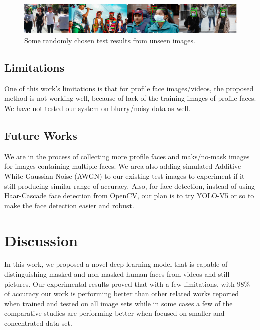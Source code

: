 \documentclass{svproc}
\begin{document}
\begin{figure}[!ht]
\includegraphics[width=1\textwidth]{test_image.PNG}
\centering
\caption{Some randomly chosen test results from unseen images.}
\label{testresult}
\end{figure}

\subsection{Limitations}

One of this work's limitations is that for profile face images/videos, the proposed method is not working well, because of lack of the training images of profile faces. We have not tested our system on blurry/noisy data as well.

\subsection{Future Works}

We are in the process of collecting more profile faces and maks/no-mask images for images containing multiple faces. We area also adding simulated Additive White Gaussian Noise (AWGN) to our existing test images to experiment if it still producing similar range of accuracy. Also, for face  detection, instead of using Haar-Cascade face detection from OpenCV, our plan is to try YOLO-V5 or so to make the face detection easier and robust.

\section{Discussion}

In this work, we proposed a novel deep learning model that is capable of distinguishing masked and non-masked human faces from videos and still pictures. Our experimental results proved that with a few limitations, with $98\%$ of accuracy our work is performing better than other related works reported when trained and tested on all image sets while in some cases a few of the comparative studies are performing better when focused on smaller and concentrated data set. 
\end{document}
